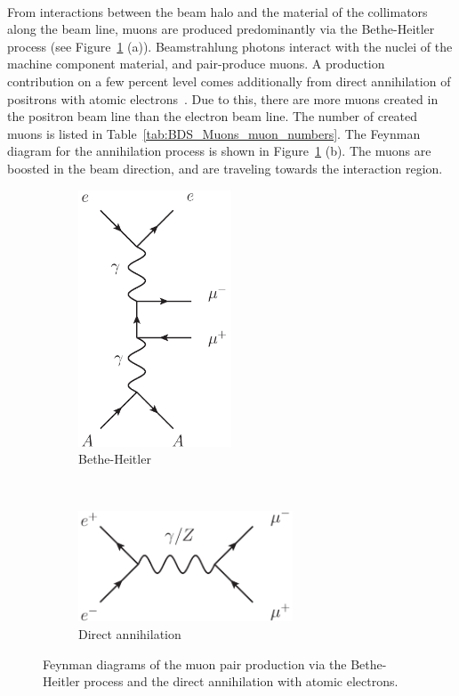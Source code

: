 \\From interactions between the beam halo and the material of the collimators along the beam line, muons are produced predominantly via the Bethe-Heitler process (see Figure~\ref{fig:BDS_Muons:Muon_production} (a)).
Beamstrahlung photons interact with the nuclei of the machine component material, and pair-produce muons.
A production contribution on a few percent level comes additionally from direct annihilation of positrons with atomic electrons~\cite{MuonBkg_1TeV}.
Due to this, there are more muons created in the positron beam line than the electron beam line.
The number of created muons is listed in Table~\ref{tab:BDS_Muons_muon_numbers}.
The Feynman diagram for the annihilation process is shown in Figure~\ref{fig:BDS_Muons:Muon_production} (b).
The muons are boosted in the beam direction, and are traveling towards the interaction region.\\
\begin{figure}
    \centering
    \begin{subfigure}[b]{0.4\textwidth}\centering
    \includegraphics[width=0.5\textwidth]{Feynman_diagrams/Jaxo_BetheHeitler.png}
    \caption{Bethe-Heitler}
    \end{subfigure}\\
    \begin{subfigure}[b]{0.4\textwidth}\centering
    \includegraphics[width=0.7\textwidth]{Feynman_diagrams/Jaxo_annihilation.png}
     \caption{Direct annihilation}
     \end{subfigure}
    \caption[Muon production processes]{
    Feynman diagrams of the muon pair production via the Bethe-Heitler process and the direct annihilation with atomic electrons.}
    \label{fig:BDS_Muons:Muon_production}
\end{figure}
